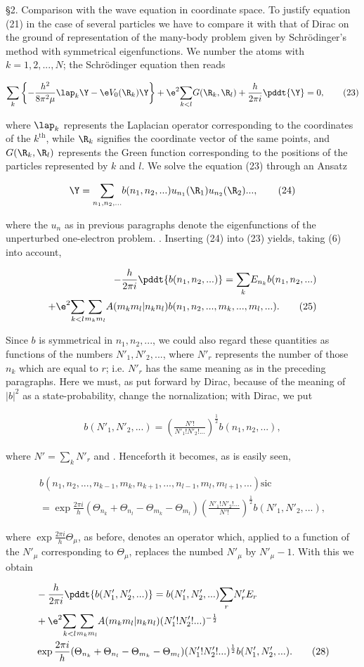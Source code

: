 \documentclass{article}
\newcommand{\nequ}[2]{
\begin{align*}
#1
\tag{#2}
\end{align*}
}
\newcommand{\sumX}[1]{\underset{#1}{\sum}}
\begin{document}
§2. Comparison with the wave equation in coordinate space.
To justify equation (21) in the case of several particles we have to compare it with that of Dirac on the ground of representation of the many-body problem given by Schrödinger's method with symmetrical eigenfunctions. We number the atoms with $k=1,2,...,N$; the Schrödinger equation then reads
\nequ{
\sumX{k}\left\{-\frac{h^2}{8\pi^2\mu}\lap_k\Y - \e V_0(\R_k)\Y\right\} 
+ \e^2\sumX{k<l}G(\R_k,\R_l) + \frac{h}{2\pi i}\pddt{\Y} = 0,
}{23}
where $\lap_k$ represents the Laplacian operator corresponding to the coordinates of the $k^{\text{th}}$, while $\R_k$ signifies the coordinate vector of the same points, and $G(\R_k,\R_l)$ represents the Green function corresponding to the positions of the particles represented by $k$ and $l$. We solve the equation (23) through an Ansatz
\nequ{
\Y = \sumX{n_1,n_2,...}b(n_1,n_2,...)u_{n_1}(\R_1)u_{n_2}(\R_2)...,
}{24}
where the $u_n$ as in previous paragraphs denote the eigenfunctions of the unperturbed one-electron problem. . Inserting (24) into (23) yields, taking (6) into account,
\nequ{
-\frac{h}{2\pi i}\pddt{b(n_1,n_2,...)} = \sumX{k}E_{n_k} b(n_1,n_2,...)\\
+ \e^2 \sumX{k<l}\sumX{m_k m_l}A(m_k m_l| n_k n_l)b(n_1,n_2,...,m_k,...,m_l,...).
}{25}

Since $b$ is symmetrical in $n_1, n_2, ...$, we could also regard these quantities as functions of the numbers $N'_1, N'_2,...$, where $N'_r$ represents the number of those $n_k$ which are equal to $r$; i.e. $N'_r$ has the same meaning as in the preceding paragraphs. Here we must, as put forward by Dirac, because of the meaning of $|b|^2$ as a state-probability, change the nornalization; with Dirac, we put
\nequ{
b(N'_1,N'_2,...) = \left(\frac{N'!}{N'_1! N'_2! ...}\right)^{\frac{1}{2}} b(n_1,n_2,...),
}{26}
where $N' = \sumX{k}N'_r$ and . Henceforth it becomes, as is easily seen, 
\nequ{
b(n_1,n_2,...,n_{k-1},m_k,n_{k+1},...,n_{l-1},m_l,m_{l+1},...)\text{sic} \\
= \exp{\frac{2\pi i}{h}(\Theta_{n_k} + \Theta_{n_l} - \Theta_{m_k} - \Theta_{m_l})}
\left(\frac{N'_1! N'_2! ...}{N'!}\right)^{\frac{1}{2}} b(N'_1,N'_2,...),
}{27}
where $\exp{\frac{2\pi i}{h}\Theta_\mu}$, as before, denotes an operator which, applied to a function of the $N'_\mu$ corresponding to $\Theta_\mu$, replaces the numbed $N'_\mu$ by $N'_\mu - 1$. With this we obtain
\nequ{
&-\frac{h}{2\pi i}\pddt{b(N'_1,N'_2,...)} = b(N'_1,N'_2,...) \sumX{r}N'_r E_r\\
&+ \e^2 \sumX{k<l}\sumX{m_k m_l} A(m_k m_l | n_k n_l)(N'_1! N'_2! ...)^{-\frac{1}{2}}\\
&\exp{\frac{2\pi i}{h}(\Theta_{n_k} + \Theta_{n_l} - \Theta_{m_k} - \Theta_{m_l})}
(N'_1! N'_2! ...)^{\frac{1}{2}} b(N'_1,N'_2,...).
}{28}
\end{document}
